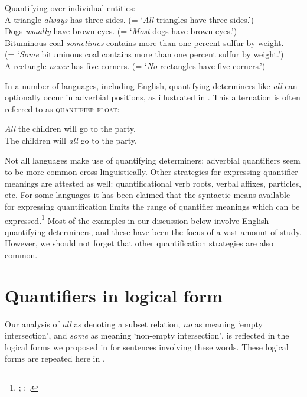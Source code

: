 \ea \label{ex:14.8}
Quantifying over individual entities:\\
\ea A triangle \textit{always} has three sides. (= ‘\textit{All} triangles have three sides.’)\\
\ex Dogs \textit{usually} have brown eyes. (= ‘\textit{Most} dogs have brown eyes.’)\\
\ex Bituminous coal \textit{sometimes} contains more than one percent sulfur by weight.\\
  (= ‘\textit{Some} bituminous coal contains more than one percent sulfur by weight.’)\\
\ex A rectangle \textit{never} has five corners. (= ‘\textit{No} rectangles have five corners.’)
                       \z
\z


In a number of languages, including English, quantifying determiners like \textit{all} can optionally occur in adverbial positions, as illustrated in . This alternation is often referred to as \textsc{quantifier float}:


\ea \label{ex:14.9}
\ea \textit{All} the children will go to the party.\\
\ex The children will \textit{all} go to the party.
                       \z
\z


Not all languages make use of quantifying determiners; adverbial quantifiers seem to be more common cross-linguistically. Other strategies for expressing quantifier meanings are attested as well: quantificational verb roots, verbal affixes, particles, etc. For some languages it has been claimed that the syntactic means available for expressing quantification limits the range of quantifier meanings which can be expressed.\footnote{\citet{Baker1995}; \citet{Bittner1995}; \citet{KoenigMichelson2010}.} Most of the examples in our discussion below involve English quantifying determiners, and these have been the focus of a vast amount of study. However, we should not forget that other quantification strategies are also common.


\section{Quantifiers in logical form}\label{sec:14.3}

Our analysis of \textit{all} as denoting a subset relation, \textit{no} as meaning ‘empty intersection’, and \textit{some} as meaning ‘non-empty intersection’, is reflected in the logical forms we proposed in  for sentences involving these words. These logical forms are repeated here in .


